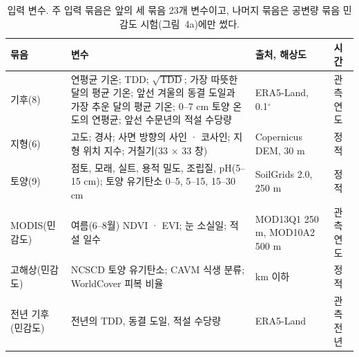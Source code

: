 \documentclass[pdflatex,sn-nature]{sn-jnl}
\begin{document}
\begin{table}[htbp]
\caption{입력 변수. 주 입력 묶음은 앞의 세 묶음 23개 변수이고, 나머지 묶음은 공변량 묶음 민감도 시험(그림~4a)에만 썼다.}\label{tab:s2}
\scriptsize
\begin{tabular}{@{}>{\raggedright\arraybackslash}p{}>{\raggedright\arraybackslash}p{}>{\raggedright\arraybackslash}p{}>{\raggedright\arraybackslash}p{}@{}}
\toprule
묶음 & 변수 & 출처, 해상도 & 시간 \\
\midrule
기후(8) & 연평균 기온; TDD; $\sqrt{\mathrm{TDD}}$; 가장 따뜻한 달의 평균 기온; 앞선 겨울의 동결 도일과 가장 추운 달의 평균 기온; 0--7 cm 토양 온도의 연평균; 앞선 수문년의 적설 수당량 & ERA5-Land, 0.1$^\circ$ & 관측 연도 \\
지형(6) & 고도; 경사; 사면 방향의 사인 · 코사인; 지형 위치 지수; 거칠기(33 × 33 창) & Copernicus DEM, 30 m & 정적 \\
토양(9) & 점토, 모래, 실트, 용적 밀도, 조립질, pH(5--15 cm); 토양 유기탄소 0--5, 5--15, 15--30 cm & SoilGrids 2.0, 250 m & 정적 \\
MODIS(민감도) & 여름(6--8월) NDVI · EVI; 눈 소실일; 적설 일수 & MOD13Q1 250 m, MOD10A2 500 m & 관측 연도 \\
고해상(민감도) & NCSCD 토양 유기탄소; CAVM 식생 분류; WorldCover 피복 비율 & 1 km 이하 & 정적 \\
전년 기후(민감도) & 전년의 TDD, 동결 도일, 적설 수당량 & ERA5-Land & 관측 전년 \\
\bottomrule
\end{tabular}
\end{table}
\end{document}
